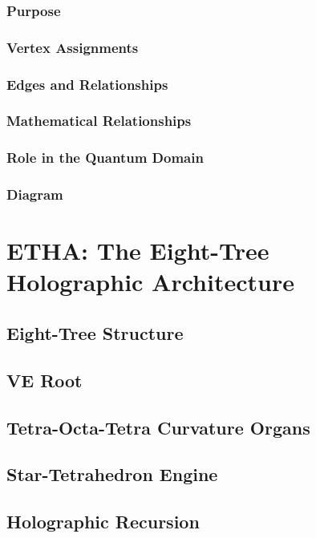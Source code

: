 \documentclass[12pt]{article}
\begin{document}
\subsubsection{Purpose}
\subsubsection{Vertex Assignments}
\subsubsection{Edges and Relationships}
\subsubsection{Mathematical Relationships}
\subsubsection{Role in the Quantum Domain}
\subsubsection{Diagram}


\section{ETHA: The Eight-Tree Holographic Architecture}

\subsection{Eight-Tree Structure}
\subsection{VE Root}
\subsection{Tetra-Octa-Tetra Curvature Organs}
\subsection{Star-Tetrahedron Engine}
\subsection{Holographic Recursion}
\end{document}
